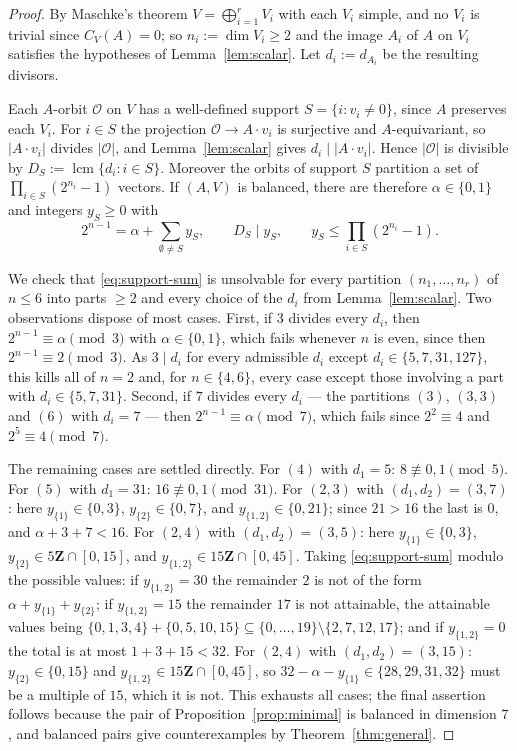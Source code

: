 \documentclass[11pt]{article}
\theoremstyle{definition}
\theoremstyle{remark}
\begin{document}
\begin{proof}
By Maschke's theorem $V=\bigoplus_{i=1}^rV_i$ with each $V_i$ simple,
and no $V_i$ is trivial since $C_V(A)=0$; so $n_i:=\dim V_i\ge2$ and
the image $A_i$ of $A$ on $V_i$ satisfies the hypotheses of
Lemma~\ref{lem:scalar}.  Let $d_i:=d_{A_i}$ be the resulting divisors.

Each $A$-orbit $\mathcal O$ on $V$ has a well-defined support
$S=\{i:v_i\neq0\}$, since $A$ preserves each $V_i$.  For
$i\in S$ the projection $\mathcal O\to A\cdot v_i$ is surjective and
$A$-equivariant, so $|A\cdot v_i|$ divides $|\mathcal O|$, and
Lemma~\ref{lem:scalar} gives $d_i\mid|A\cdot v_i|$.  Hence
$|\mathcal O|$ is divisible by $D_S:=\operatorname{lcm}\{d_i:i\in S\}$.
Moreover the orbits of support $S$ partition a set of
$\prod_{i\in S}(2^{n_i}-1)$ vectors.  If $(A,V)$ is balanced, there are
therefore $\alpha\in\{0,1\}$ and integers $y_S\ge0$ with
\begin{equation}\label{eq:support-sum}
 2^{n-1}=\alpha+\sum_{\emptyset\neq S}y_S,
 \qquad D_S\mid y_S,
 \qquad y_S\le\prod_{i\in S}(2^{n_i}-1) .
\end{equation}

We check that \eqref{eq:support-sum} is unsolvable for every partition
$(n_1,\dots,n_r)$ of $n\le6$ into parts $\ge2$ and every choice of the
$d_i$ from Lemma~\ref{lem:scalar}.  Two observations dispose of most
cases.  First, if $3$ divides every $d_i$, then
$2^{n-1}\equiv\alpha\pmod3$ with $\alpha\in\{0,1\}$, which fails
whenever $n$ is even, since then $2^{n-1}\equiv2\pmod3$.  As
$3\mid d_i$ for every admissible $d_i$ except $d_i\in\{5,7,31,127\}$,
this kills all of $n=2$ and, for $n\in\{4,6\}$, every case except those
involving a part with $d_i\in\{5,7,31\}$.  Second, if $7$ divides every
$d_i$ --- the partitions $(3)$, $(3,3)$ and $(6)$ with
$d_i=7$ --- then $2^{n-1}\equiv\alpha\pmod7$, which fails since
$2^2\equiv4$ and $2^5\equiv4\pmod7$.

The remaining cases are settled directly.  For $(4)$ with $d_1=5$:
$8\not\equiv0,1\pmod5$.  For $(5)$ with $d_1=31$: $16\not\equiv0,1
\pmod{31}$.  For $(2,3)$ with $(d_1,d_2)=(3,7)$: here
$y_{\{1\}}\in\{0,3\}$, $y_{\{2\}}\in\{0,7\}$, and
$y_{\{1,2\}}\in\{0,21\}$; since $21>16$ the last is $0$, and
$\alpha+3+7<16$.  For $(2,4)$ with $(d_1,d_2)=(3,5)$: here
$y_{\{1\}}\in\{0,3\}$, $y_{\{2\}}\in5\mathbf Z\cap[0,15]$, and
$y_{\{1,2\}}\in15\mathbf Z\cap[0,45]$.  Taking
\eqref{eq:support-sum} modulo the possible values: if
$y_{\{1,2\}}=30$ the remainder $2$ is not of the form $\alpha+y_{\{1\}}
+y_{\{2\}}$; if $y_{\{1,2\}}=15$ the remainder $17$ is not attainable,
the attainable values being
$\{0,1,3,4\}+\{0,5,10,15\}\subseteq\{0,\dots,19\}\setminus\{2,7,12,17\}$;
and if $y_{\{1,2\}}=0$ the total is at most $1+3+15<32$.  For
$(2,4)$ with $(d_1,d_2)=(3,15)$: $y_{\{2\}}\in\{0,15\}$ and
$y_{\{1,2\}}\in15\mathbf Z\cap[0,45]$, so
$32-\alpha-y_{\{1\}}\in\{28,29,31,32\}$ must be a multiple of $15$,
which it is not.  This exhausts all cases; the final assertion follows
because the pair of Proposition~\ref{prop:minimal} is balanced in
dimension $7$, and balanced pairs give counterexamples by
Theorem~\ref{thm:general}.
\end{proof}
\end{document}

